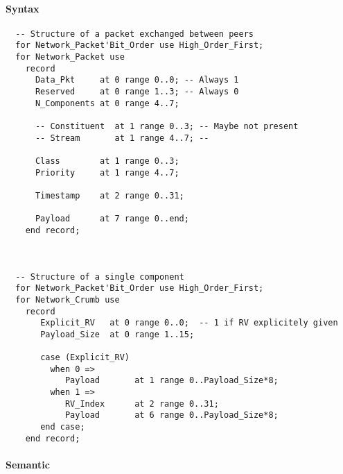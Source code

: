 \documentclass{medusabook}
\begin{document}
\paragraph{Syntax}

\begin{verbatim}
  -- Structure of a packet exchanged between peers
  for Network_Packet'Bit_Order use High_Order_First;
  for Network_Packet use
    record
      Data_Pkt     at 0 range 0..0; -- Always 1
      Reserved     at 0 range 1..3; -- Always 0
      N_Components at 0 range 4..7;

      -- Constituent  at 1 range 0..3; -- Maybe not present
      -- Stream       at 1 range 4..7; -- 

      Class        at 1 range 0..3;
      Priority     at 1 range 4..7;

      Timestamp    at 2 range 0..31;

      Payload      at 7 range 0..end;
    end record;



  -- Structure of a single component 
  for Network_Packet'Bit_Order use High_Order_First;
  for Network_Crumb use
    record
       Explicit_RV   at 0 range 0..0;  -- 1 if RV explicitely given
       Payload_Size  at 0 range 1..15;

       case (Explicit_RV)
         when 0 => 
            Payload       at 1 range 0..Payload_Size*8;
         when 1 => 
            RV_Index      at 2 range 0..31;
            Payload       at 6 range 0..Payload_Size*8;
       end case;
    end record;
\end{verbatim}

\paragraph{Semantic}
\label{subsub:1.4.0;medusa_book}
\end{document}

